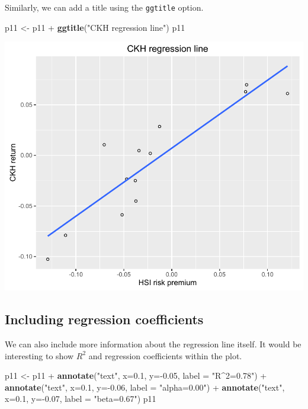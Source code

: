 \documentclass[]{article}
\newenvironment{Shaded}{\begin{snugshade}}{\end{snugshade}}
\newcommand{\KeywordTok}[1]{\textcolor[rgb]{0.13,0.29,0.53}{\textbf{{#1}}}}
\newcommand{\DataTypeTok}[1]{\textcolor[rgb]{0.13,0.29,0.53}{{#1}}}
\newcommand{\FloatTok}[1]{\textcolor[rgb]{0.00,0.00,0.81}{{#1}}}
\newcommand{\StringTok}[1]{\textcolor[rgb]{0.31,0.60,0.02}{{#1}}}
\newcommand{\NormalTok}[1]{{#1}}
\begin{document}
Similarly, we can add a title using the \texttt{ggtitle} option.

\begin{Shaded}
\begin{Highlighting}[]
\NormalTok{p11 <-}\StringTok{ }\NormalTok{p11 +}\StringTok{ }\KeywordTok{ggtitle}\NormalTok{(}\StringTok{"CKH regression line"}\NormalTok{)}
\NormalTok{p11}
\end{Highlighting}
\end{Shaded}

\begin{center}\includegraphics{11_Linear_Regression_Plot_pdf/lr_9-1} \end{center}

\subsection{Including regression
coefficients}\label{including-regression-coefficients}

We can also include more information about the regression line itself.
It would be interesting to show \(R^2\) and regression coefficients
within the plot.

\begin{Shaded}
\begin{Highlighting}[]
\NormalTok{p11 <-}\StringTok{ }\NormalTok{p11 +}\StringTok{ }\KeywordTok{annotate}\NormalTok{(}\StringTok{"text"}\NormalTok{, }\DataTypeTok{x=}\FloatTok{0.1}\NormalTok{, }\DataTypeTok{y=}\NormalTok{-}\FloatTok{0.05}\NormalTok{, }\DataTypeTok{label =} \StringTok{"R^2=0.78"}\NormalTok{) +}\StringTok{ }
\StringTok{  }\KeywordTok{annotate}\NormalTok{(}\StringTok{"text"}\NormalTok{, }\DataTypeTok{x=}\FloatTok{0.1}\NormalTok{, }\DataTypeTok{y=}\NormalTok{-}\FloatTok{0.06}\NormalTok{, }\DataTypeTok{label =} \StringTok{"alpha=0.00"}\NormalTok{) +}\StringTok{ }
\StringTok{  }\KeywordTok{annotate}\NormalTok{(}\StringTok{"text"}\NormalTok{, }\DataTypeTok{x=}\FloatTok{0.1}\NormalTok{, }\DataTypeTok{y=}\NormalTok{-}\FloatTok{0.07}\NormalTok{, }\DataTypeTok{label =} \StringTok{"beta=0.67"}\NormalTok{)}
\NormalTok{p11}
\end{Highlighting}
\end{Shaded}
\end{document}
